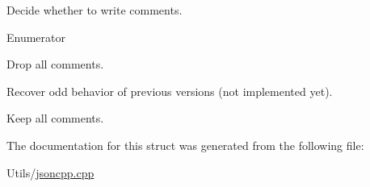 Decide whether to write comments. 

\begin{Desc}
\item[Enumerator]\par
\begin{description}
\item[{\em 
\hypertarget{structJson_1_1CommentStyle_a51fc08f3518fd81eba12f340d19a3d0cac8b32a8bae63414c8647d4919da8d437}{None}\label{structJson_1_1CommentStyle_a51fc08f3518fd81eba12f340d19a3d0cac8b32a8bae63414c8647d4919da8d437}
}]Drop all comments. \item[{\em 
\hypertarget{structJson_1_1CommentStyle_a51fc08f3518fd81eba12f340d19a3d0cac65238f050773c107690a456e9c05c98}{Most}\label{structJson_1_1CommentStyle_a51fc08f3518fd81eba12f340d19a3d0cac65238f050773c107690a456e9c05c98}
}]Recover odd behavior of previous versions (not implemented yet). \item[{\em 
\hypertarget{structJson_1_1CommentStyle_a51fc08f3518fd81eba12f340d19a3d0ca32302c0b97190c1808b3e38f367fef01}{All}\label{structJson_1_1CommentStyle_a51fc08f3518fd81eba12f340d19a3d0ca32302c0b97190c1808b3e38f367fef01}
}]Keep all comments. \end{description}
\end{Desc}


The documentation for this struct was generated from the following file\-:\begin{DoxyCompactItemize}
\item 
Utils/\hyperlink{jsoncpp_8cpp}{jsoncpp.\-cpp}\end{DoxyCompactItemize}
